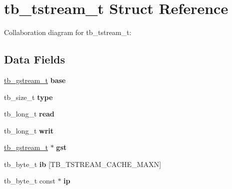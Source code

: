 \hypertarget{structtb__tstream__t}{\section{tb\-\_\-tstream\-\_\-t Struct Reference}
\label{da/d93/structtb__tstream__t}
}


Collaboration diagram for tb\-\_\-tstream\-\_\-t\-:
\subsection*{Data Fields}
\begin{DoxyCompactItemize}
\item 
\hypertarget{structtb__tstream__t_a5ee9f026844d999588ebd24d2f1815e5}{\hyperlink{structtb__gstream__t}{tb\-\_\-gstream\-\_\-t} {\bfseries base}}\label{da/d93/structtb__tstream__t_a5ee9f026844d999588ebd24d2f1815e5}

\item 
\hypertarget{structtb__tstream__t_a8ed11cbc2a0b2b27dc24c8d8ccc3d992}{tb\-\_\-size\-\_\-t {\bfseries type}}\label{da/d93/structtb__tstream__t_a8ed11cbc2a0b2b27dc24c8d8ccc3d992}

\item 
\hypertarget{structtb__tstream__t_ae8caae4523b0afc4a3077bd29005177d}{tb\-\_\-long\-\_\-t {\bfseries read}}\label{da/d93/structtb__tstream__t_ae8caae4523b0afc4a3077bd29005177d}

\item 
\hypertarget{structtb__tstream__t_a7900136409285f860adb81226972621f}{tb\-\_\-long\-\_\-t {\bfseries writ}}\label{da/d93/structtb__tstream__t_a7900136409285f860adb81226972621f}

\item 
\hypertarget{structtb__tstream__t_a8a8f792870b12566cc323c094453a801}{\hyperlink{structtb__gstream__t}{tb\-\_\-gstream\-\_\-t} $\ast$ {\bfseries gst}}\label{da/d93/structtb__tstream__t_a8a8f792870b12566cc323c094453a801}

\item 
\hypertarget{structtb__tstream__t_a58ee5f510012c4c32436aa2560471712}{tb\-\_\-byte\-\_\-t {\bfseries ib} \mbox{[}T\-B\-\_\-\-T\-S\-T\-R\-E\-A\-M\-\_\-\-C\-A\-C\-H\-E\-\_\-\-M\-A\-X\-N\mbox{]}}\label{da/d93/structtb__tstream__t_a58ee5f510012c4c32436aa2560471712}

\item 
\hypertarget{structtb__tstream__t_abd9f0615d3fbd9648ce650a703fc7747}{tb\-\_\-byte\-\_\-t const $\ast$ {\bfseries ip}}\label{da/d93/structtb__tstream__t_abd9f0615d3fbd9648ce650a703fc7747}


\end{DoxyCompactItemize}
